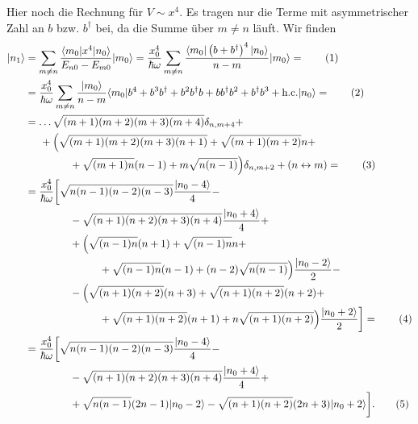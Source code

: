 \documentclass[english, parskip=full]{scrartcl}
\newcommand\numberthis{\addtocounter{equation}{1}\tag{\theequation}}
\renewcommand{\bra}{}
\renewcommand{\braket}{}
\newcommand{\kla}{}
\newcommand{\klam}{}
\newcommand{\tecxt}{}
\newcommand{\Ket}{}
\begin{document}
Hier noch die Rechnung für $V\sim x^4$.
Es tragen nur die Terme mit asymmetrischer Zahl an $b$ bzw. $b^\dagger$ bei, da die Summe über $m\neq n$ läuft.
Wir finden
\begin{align*}
\Ket | n_1 \rangle &= \sum_{m\neq n} \frac{\braket\langle m_0 | x^4 | n_0 \rangle}{E_{n0} - E_{m0}} \Ket | m_0 \rangle = \frac{x_0^4}{\hbar\omega} \sum_{m\neq n} \frac{\braket\langle m_0 | \kla\left( b+b^\dagger \right)^4 | n_0 \rangle}{ n - m } \Ket | m_0 \rangle = \numberthis \\
&= \frac{x_0^4}{\hbar\omega} \sum_{m\neq n} \frac{\Ket | m_0 \rangle}{n - m} \braket\langle m_0 | b^4 + b^3b^\dagger + b^2b^\dagger b + bb^\dagger b^2 + b^\dagger b^3 + \tecxt\text{h.c.} | n_0 \rangle = \numberthis \\
&= \dots \sqrt{(m+1)(m+2)(m+3)(m+4)} \delta_{n,m+4} + \\
&\hspace{0.5cm} + \Big( \sqrt{(m+1)(m+2)(m+3)(n+1)} + \sqrt{(m+1)(m+2)} n + \\
&\hspace{1.5cm} + \sqrt{(m+1)n}(n-1) + m\sqrt{n(n-1)} \Big) \delta_{n,m+2} + (n\leftrightarrow m) = \numberthis \\
&= \frac{x_0^4}{\hbar\omega} \bigg[ \sqrt{n(n-1)(n-2)(n-3)} \frac{\Ket | n_0 - 4 \rangle}{4} - \\
&\hspace{1.5cm} - \sqrt{(n+1)(n+2)(n+3)(n+4)} \frac{\Ket | n_0 + 4 \rangle}{4} + \\
&\hspace{1.5cm} + \Big( \sqrt{(n-1)n}(n+1) + \sqrt{(n-1)n}n + \\
&\hspace{2.5cm} + \sqrt{(n-1)n}(n-1) + (n-2)\sqrt{n(n-1)} \Big) \frac{\Ket | n_0-2 \rangle}{2} - \\
&\hspace{1.5cm} - \Big( \sqrt{(n+1)(n+2)}(n+3) + \sqrt{(n+1)(n+2)}(n+2) + \\
&\hspace{2.5cm} + \sqrt{(n+1)(n+2)}(n+1) + n\sqrt{(n+1)(n+2)} \Big) \frac{\Ket | n_0 + 2 \rangle}{2} \bigg] =  \numberthis \\
&= \frac{x_0^4}{\hbar\omega} \bigg[ \sqrt{n(n-1)(n-2)(n-3)} \frac{\Ket | n_0 - 4 \rangle}{4} - \\
&\hspace{1.5cm} - \sqrt{(n+1)(n+2)(n+3)(n+4)} \frac{\Ket | n_0 + 4 \rangle}{4} + \\
&\hspace{1.5cm} + \sqrt{n(n-1)}(2n-1)\Ket | n_0 - 2 \rangle - \sqrt{(n+1)(n+2)} (2n+3)\Ket | n_0 + 2 \rangle \bigg]. \numberthis
\end{align*}
\end{document}
